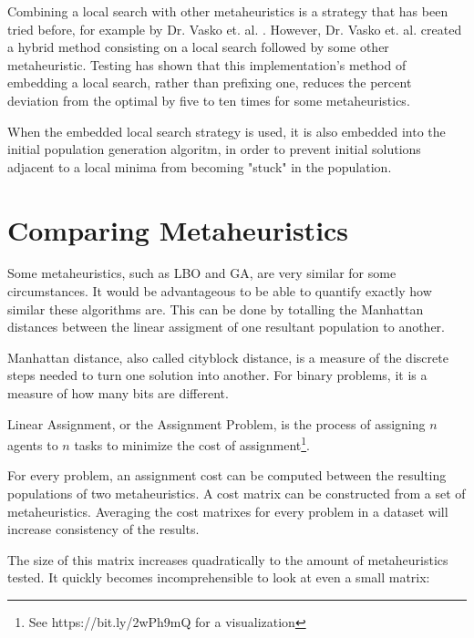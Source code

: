 \documentclass[11pt, letterpaper, onecolumn]{article}
\begin{document}
\begin{table}[htbp]
\end{table}

Combining a local search with other metaheuristics is a strategy that has been tried before, for example by Dr. Vasko et. al. \cite{mmkp}. However, Dr. Vasko et. al. created a hybrid method consisting on a local search followed by some other metaheuristic. Testing has shown that this implementation's method of embedding a local search, rather than prefixing one, reduces the percent deviation from the optimal by five to ten times for some metaheuristics.

When the embedded local search strategy is used, it is also embedded into the initial population generation algoritm, in order to prevent initial solutions adjacent to a local minima from becoming "stuck" in the population. 

\section{Comparing Metaheuristics} \label{compare}

Some metaheuristics, such as LBO and GA, are very similar for some circumstances. It would be advantageous to be able to quantify exactly how similar these algorithms are. This can be done by totalling the Manhattan distances between the linear assigment of one resultant population to another. 

Manhattan distance, also called cityblock distance, is a measure of the discrete steps needed to turn one solution into another. For binary problems, it is a measure of how many bits are different. 

Linear Assignment, or the Assignment Problem, is the process of assigning $n$ agents to $n$ tasks to minimize the cost of assignment\footnote{See https://bit.ly/2wPh9mQ for a visualization}. 

For every problem, an assignment cost can be computed between the resulting populations of two metaheuristics. A cost matrix can be constructed from a set of metaheuristics. Averaging the cost matrixes for every problem in a dataset will increase consistency of the results. 

The size of this matrix increases quadratically to the amount of metaheuristics tested. It quickly becomes incomprehensible to look at even a small matrix:	
\end{document}
